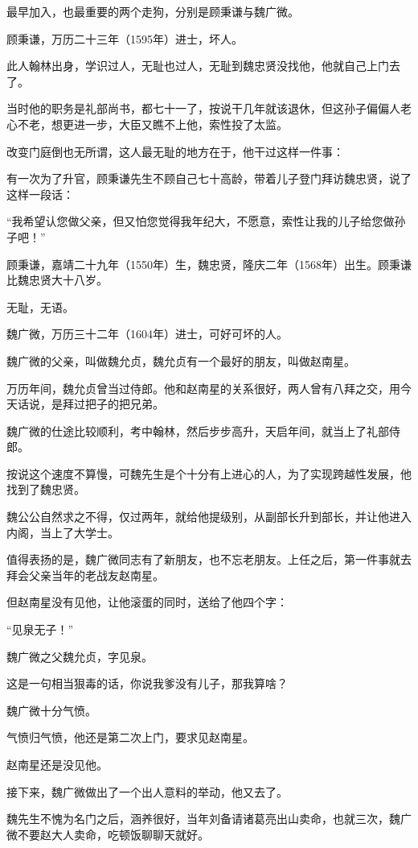 \begin{multicols}{\theparacolNo}
		最早加入，也最重要的两个走狗，分别是顾秉谦与魏广微。

		顾秉谦，万历二十三年（1595年）进士，坏人。

		此人翰林出身，学识过人，无耻也过人，无耻到魏忠贤没找他，他就自己上门去了。

		当时他的职务是礼部尚书，都七十一了，按说干几年就该退休，但这孙子偏偏人老心不老，想更进一步，大臣又瞧不上他，索性投了太监。

		改变门庭倒也无所谓，这人最无耻的地方在于，他干过这样一件事：

		有一次为了升官，顾秉谦先生不顾自己七十高龄，带着儿子登门拜访魏忠贤，说了这样一段话：

		“我希望认您做父亲，但又怕您觉得我年纪大，不愿意，索性让我的儿子给您做孙子吧！”

		顾秉谦，嘉靖二十九年（1550年）生，魏忠贤，隆庆二年（1568年）出生。顾秉谦比魏忠贤大十八岁。

		无耻，无语。

		魏广微，万历三十二年（1604年）进士，可好可坏的人。

		魏广微的父亲，叫做魏允贞，魏允贞有一个最好的朋友，叫做赵南星。

		万历年间，魏允贞曾当过侍郎。他和赵南星的关系很好，两人曾有八拜之交，用今天话说，是拜过把子的把兄弟。

		魏广微的仕途比较顺利，考中翰林，然后步步高升，天启年间，就当上了礼部侍郎。

		按说这个速度不算慢，可魏先生是个十分有上进心的人，为了实现跨越性发展，他找到了魏忠贤。

		魏公公自然求之不得，仅过两年，就给他提级别，从副部长升到部长，并让他进入内阁，当上了大学士。

		值得表扬的是，魏广微同志有了新朋友，也不忘老朋友。上任之后，第一件事就去拜会父亲当年的老战友赵南星。

		但赵南星没有见他，让他滚蛋的同时，送给了他四个字：

		“见泉无子！”

		魏广微之父魏允贞，字见泉。

		这是一句相当狠毒的话，你说我爹没有儿子，那我算啥？

		魏广微十分气愤。

		气愤归气愤，他还是第二次上门，要求见赵南星。

		赵南星还是没见他。

		接下来，魏广微做出了一个出人意料的举动，他又去了。

		魏先生不愧为名门之后，涵养很好，当年刘备请诸葛亮出山卖命，也就三次，魏广微不要赵大人卖命，吃顿饭聊聊天就好。


\end{multicols}
